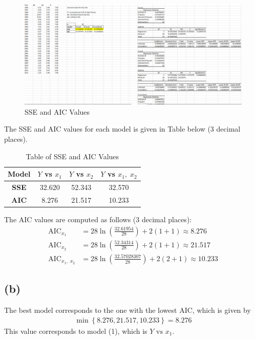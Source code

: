 \documentclass[12pt]{article}
\begin{document}
\begin{figure}[H]
    \centering
    \includegraphics[width=\textwidth]{Images/Q4SSE.png}
    \caption{SSE and AIC Values}
    \label{fig:4-sseaic}
\end{figure} 

\noindent The SSE and AIC values for each model is given in Table below (3 decimal places). 

\begin{table}[H]
    \centering
    \begin{tabular}{| c | c | c | c |} \hline
        \textbf{Model} & $Y$ vs $x_1$ & $Y$ vs $x_2$ & $Y$ vs $x_1, \; x_2$ \\ \hline 
        \textbf{SSE} & 32.620 & 52.343 & 32.570 \\ \hline 
        \textbf{AIC} & 8.276 & 21.517 & 10.233 \\ \hline
    \end{tabular}
    \caption{Table of SSE and AIC Values}
    \label{5-sseaic}
\end{table}

\noindent The AIC values are computed as follows (3 decimal places): \begin{align*}
    \text{AIC}_{x_1} &= 28 \ln \left( \frac{32.61954}{28} \right) + 2 (1+1) \approx 8.276 \\
    \text{AIC}_{x_2} &= 28 \ln \left( \frac{52.34314}{28} \right) + 2 (1+1) \approx 21.517\\ 
    \text{AIC}_{x_1, \; x_2} &= 28 \ln \left( \frac{32.57028307}{28} \right) + 2 (2+1) \approx 10.233
\end{align*} 

\subsection*{(b)}

The best model corresponds to the one with the lowest AIC, which is given by \begin{align*}
    \min \left\{ 8.276, 21.517, 10.233 \right\} = 8.276
\end{align*} This value corresponds to model (1), which is $Y \text{ vs } x_1$. 
\end{document}
